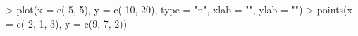 \begin{Schunk}
\begin{Sinput}
> plot(x = c(-5, 5), y = c(-10, 20), 
      type = "n", xlab = "", ylab = "")
> points(x = c(-2, 1, 3), y = c(9, 7, 2))
\end{Sinput}
\end{Schunk}
